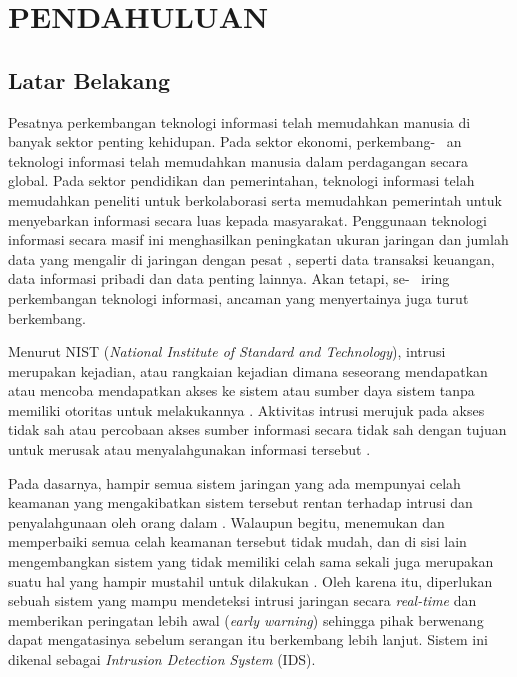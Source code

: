 \documentclass[a4paper,12pt]{report}
\begin{document}
\chapter{PENDAHULUAN}

\thispagestyle{empty}

\section{Latar Belakang}

Pesatnya perkembangan teknologi informasi telah memudahkan manusia di banyak sektor penting kehidupan. Pada sektor ekonomi, perkembang- \ an teknologi informasi telah memudahkan manusia dalam perdagangan secara global. Pada sektor pendidikan dan pemerintahan, teknologi informasi telah memudahkan peneliti untuk berkolaborasi serta memudahkan pemerintah untuk menyebarkan informasi secara luas kepada masyarakat. Penggunaan teknologi informasi secara masif ini menghasilkan peningkatan ukuran jaringan dan jumlah data yang mengalir di jaringan dengan pesat \cite{ahmadNetworkIntrusionDetection2021}, seperti data transaksi keuangan, data informasi pribadi dan data penting lainnya. Akan tetapi, se- \ iring perkembangan teknologi informasi, ancaman yang menyertainya juga turut berkembang. 

Menurut NIST (\textit{National Institute of Standard and Technology}), intrusi merupakan kejadian, atau rangkaian kejadian dimana seseorang mendapatkan atau mencoba mendapatkan akses ke sistem atau sumber daya sistem tanpa memiliki otoritas untuk melakukannya \cite{nationalinstituteofstandardstechnologyIntrusion}. Aktivitas intrusi merujuk pada akses tidak sah atau percobaan akses sumber informasi secara tidak sah dengan tujuan untuk merusak atau menyalahgunakan informasi tersebut \cite{mukkamalaIntrusionDetectionUsing2002}. 

Pada dasarnya, hampir semua sistem jaringan yang ada mempunyai celah keamanan yang mengakibatkan sistem tersebut rentan terhadap intrusi dan penyalahgunaan oleh orang dalam \cite{luntSurveyIntrusionDetection1993}. Walaupun begitu, menemukan dan memperbaiki semua celah keamanan tersebut tidak mudah, dan di sisi lain mengembangkan sistem yang tidak memiliki celah sama sekali juga merupakan suatu hal yang hampir mustahil untuk dilakukan \cite{luntSurveyIntrusionDetection1993}\cite{denningIntrusionDetectionModel1987}. Oleh karena itu, diperlukan sebuah sistem yang mampu mendeteksi intrusi jaringan secara \textit{real-time} dan memberikan peringatan lebih awal (\textit{early warning}) sehingga pihak berwenang dapat mengatasinya sebelum serangan itu berkembang lebih lanjut. Sistem ini dikenal sebagai \textit{Intrusion Detection System} (IDS).
\end{document}
